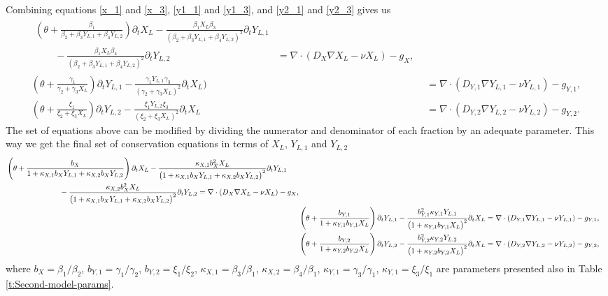 \documentclass[11pt]{article}
\begin{document}
Combining equations \eqref{x_1} and \eqref{x_3}, \eqref{y1_1} and \eqref{y1_3}, and \eqref{y2_1} and \eqref{y2_3} gives us
\begin{align}
	\begin{split} 
		\left(\theta + \frac{\beta_1}{\beta_2 + \beta_3 Y_{L,1} + \beta_4 Y_{L,2}}\right) \partial_t X_L - \frac{\beta_1 X_L \beta_3}{(\beta_2 + \beta_3 Y_{L,1} + \beta_4 Y_{L,2})^2} \partial_t Y_{L,1} \\
		\qquad
		- \frac{\beta_1 X_L \beta_4}{(\beta_2 + \beta_3 Y_{L,1} + \beta_4 Y_{L,2})^2} \partial_t Y_{L,2} 
		 &= \nabla \cdot(D_X \nabla X_L - \nu X_L) - g_X, 
	\end{split} \label{x_4} 
	\\
	(\theta + \frac{\gamma_1}{\gamma_2 + \gamma_3 X_L}) \partial_t Y_{L,1} - \frac{\gamma_1 Y_{L,1} \gamma_3}{(\gamma_2 + \gamma_3 X_L)^2} \partial_t X_L)  &= \nabla \cdot(D_{Y,1} \nabla Y_{L,1} - \nu Y_{L,1}) - g_{Y,1}, \label{y1_4} 
	\\
	(\theta + \frac{\xi_1}{\xi_2 + \xi_3 X_L}) \partial_t Y_{L,2} - \frac{\xi_1 Y_{L,2} \xi_3}{(\xi_2 + \xi_3 X_L)^2} \partial_t X_L &= \nabla \cdot(D_{Y,2} \nabla Y_{L,2} - \nu Y_{L,2}) - g_{Y,2}. \label{y2_4}	
\end{align}
The set of equations above can be modified by dividing the numerator and denominator of each fraction by an adequate parameter. This way we get the final set of conservation equations in terms of $X_L$, $Y_{L,1}$ and $Y_{L,2}$
\begin{subequations}
\begin{align}
	\begin{split} 
		&\left( \theta + \frac{b_X}{1 + \kappa_{X,1} b_{X} Y_{L,1} + \kappa_{X,2} b_{X} Y_{L,2}} \right)
		\partial_t X_L - 
		\frac{\kappa_{X,1} b_X^2 X_L}{\big(1 + \kappa_{X,1} b_{X} Y_{L,1} + \kappa_{X,2} b_{X} Y_{L,2} \big)^2} \partial_t Y_{L,1}
		\\
		&\hspace{2.5cm} -
		\frac{\kappa_{X,2} b_X^2 X_L}{\big(1 + \kappa_{X,1} b_{X} Y_{L,1} + \kappa_{X,2} b_{X} Y_{L,2} \big)^2} \partial_t Y_{L,2}
		= \nabla \cdot(D_X \nabla X_L - \nu X_L) - g_X, 
	\end{split} \label{eq:generalised-x_t}
	\\
	&\left(\theta + \frac{b_{Y,1}}{1 + \kappa_{Y,1} b_{Y,1} X_L}\right) \partial_t Y_{L,1}
	- 
	\frac{b_{Y,1}^2 \kappa_{Y,1} Y_{L,1}}{\big(1 + \kappa_{Y,1} b_{Y,1} X_L\big)^2} \partial_t X_L 
	= \nabla \cdot(D_{Y,1} \nabla Y_{L,1} - \nu Y_{L,1}) - g_{Y,1}, \label{eq:generalised-y_1_t}
	\\
	&\left(\theta + \frac{b_{Y,2}}{1 + \kappa_{Y,2} b_{Y,2} X_L}\right) \partial_t Y_{L,2} - \frac{ b_{Y,2}^2 \kappa_{Y,2} Y_{L,2}}{\big(1 + \kappa_{Y,2} b_{Y,2} X_L\big)^2} \partial_t X_L
	= \nabla \cdot(D_{Y,2} \nabla Y_{L,2} - \nu Y_{L,2}) - g_{Y,2}, \label{eq:generalised-y_2_t}
\end{align}
\end{subequations}
where $b_X = \beta_1 / \beta_2$, $b_{Y,1} = \gamma_1 / \gamma_2$, $b_{Y,2} = \xi_1 / \xi_2$, $\kappa_{X,1} = \beta_3 / \beta_1$, $\kappa_{X,2} = \beta_4 / \beta_1$, $\kappa_{Y,1} = \gamma_3 / \gamma_1$, $\kappa_{Y,1} = \xi_3 / \xi_1$ are parameters presented also in Table \ref{t:Second-model-params}.
	
\end{document}
